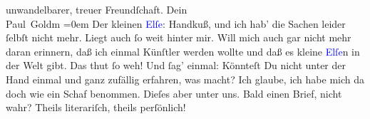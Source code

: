                unwandelbarer, treuer Freundſchaft.\pend
           \pstart
           Dein {\\[\baselineskip]}\spacefill\mbox{Paul Goldm}\pend
           \leftskip=0em{}\pstart
           \noindent{}Der kleinen \textcolor{blue}{Elſe}{}\ledrightnote{\textcolor{blue}{Else Singer}}: Handkuß, und ich hab’ die
                  Sachen leider ſelbſt nicht mehr. Liegt auch ſo weit hinter mir. Will mich auch gar
                  nicht mehr daran erinnern, daß ich einmal Künſtler werden wollte und daß es kleine
                     \textcolor{blue}{Elſe}{}\ledrightnote{\textcolor{blue}{Else Singer}}n in der {\pb}Welt gibt. Das thut ſo weh!\pend
           \pstart
           Und ſag’ einmal: Könnteſt Du nicht unter der Hand einmal und ganz zufällig
                  erfahren, was \label{K_L02704-15v}\label{K_L02704-15h} macht? Ich glaube, ich habe mich da doch wie ein Schaf benommen. Dieſes
                  aber unter uns.\pend
           \pstart
           Bald einen Brief, nicht wahr? Theils literariſch, theils perſönlich!\pend
           \endnumbering{}\begin{anhang}\end{anhang}
      